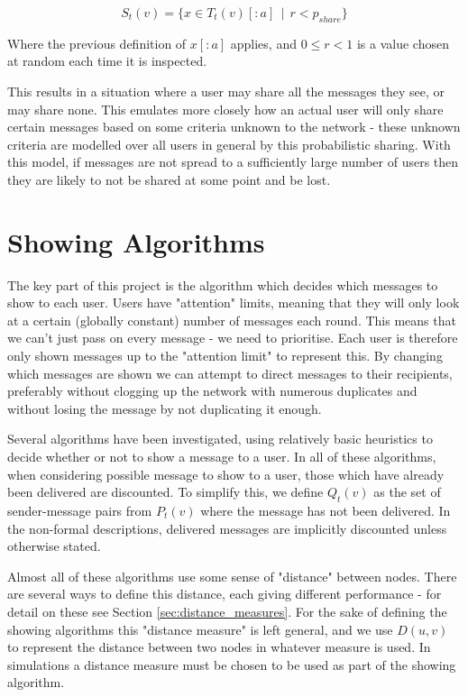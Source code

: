 \documentclass[bsc,frontabs,twoside,singlespacing,parskip,deptreport]{infthesis}     %
\begin{document}
\begin{equation}
S_{t}(v) = \{x \in T_{t}(v)[:a] \:\: | \:\:  r < p_{share}\}
\end{equation}

Where the previous definition of $x[:a]$ applies, and $0 \leq r < 1$ is a value chosen at random each time it is inspected. 

This results in a situation where a user may share all the messages they see, or may share none. This emulates more closely how an actual user will only share certain messages based on some criteria unknown to the network - these unknown criteria are modelled over all users in general by this probabilistic sharing. With this model, if messages are not spread to a sufficiently large number of users then they are likely to not be shared at some point and be lost.

\section{Showing Algorithms} \label{sec:showing_algorithms}
The key part of this project is the algorithm which decides which messages to show to each user. Users have "attention" limits, meaning that they will only look at a certain (globally constant) number of messages each round. This means that we can't just pass on every message - we need to prioritise. Each user is therefore only shown messages up to the "attention limit" to represent this. By changing which messages are shown we can attempt to direct messages to their recipients, preferably without clogging up the network with numerous duplicates and without losing the message by not duplicating it enough.

Several algorithms have been investigated, using relatively basic heuristics to decide whether or not to show a message to a user. In all of these algorithms, when considering possible message to show to a user, those which have already been delivered are discounted. To simplify this, we define $Q_{t}(v)$ as the set of sender-message pairs from $P_{t}(v)$ where the message has not been delivered. In the non-formal descriptions, delivered messages are implicitly discounted unless otherwise stated.

Almost all of these algorithms use some sense of "distance" between nodes. There are several ways to define this distance, each giving different performance - for detail on these see Section \ref{sec:distance_measures}. For the sake of defining the showing algorithms this "distance measure" is left general, and we use $D(u, v)$ to represent the distance between two nodes in whatever measure is used. In simulations a distance measure must be chosen to be used as part of the showing algorithm.
\end{document}
